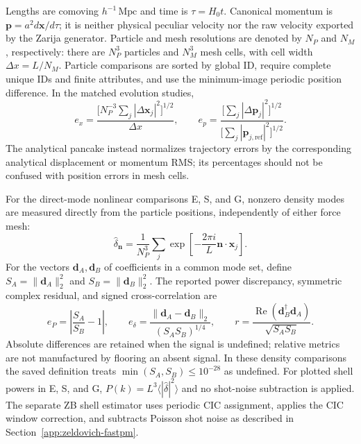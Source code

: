 Lengths are comoving $h^{-1}\,\mathrm{Mpc}$ and time is
$\tau=H_0t$.  Canonical momentum is $\boldsymbol p=a^2d\boldsymbol x/d\tau$;
it is neither physical peculiar velocity nor the raw velocity exported by the
Zarija generator.  Particle and mesh resolutions are denoted by $N_P$ and
$N_M$, respectively: there are $N_P^3$ particles and $N_M^3$ mesh cells, with
cell width $\Delta x=L/N_M$.  Particle comparisons are sorted by global ID,
require complete unique IDs and finite attributes, and use the minimum-image
periodic position difference.  In the matched evolution studies,
\begin{equation}
 e_x=\frac{\bigl[N_P^{-3}\sum_j|\Delta\boldsymbol x_j|^2\bigr]^{1/2}}
 {\Delta x},\qquad
 e_p=\frac{\bigl[\sum_j|\Delta\boldsymbol p_j|^2\bigr]^{1/2}}
 {\bigl[\sum_j|\boldsymbol p_{j,\mathrm{ref}}|^2\bigr]^{1/2}}.
 \label{eq:app-phase}
\end{equation}
The analytical pancake instead normalizes trajectory errors by the corresponding
analytical displacement or momentum RMS; its percentages should not be confused
with position errors in mesh cells.

For the direct-mode nonlinear comparisons E, S, and G, nonzero density modes
are measured directly from the particle positions, independently of either
force mesh:
\begin{equation}
 \widehat\delta_{\boldsymbol n}=
 \frac{1}{N_P^3}\sum_j\exp\!\left[-\frac{2\pi i}{L}
 \boldsymbol n\!\cdot\!\boldsymbol x_j\right].
 \label{eq:app-direct}
\end{equation}
For the vectors $\boldsymbol d_A,\boldsymbol d_B$ of coefficients in a common
mode set, define $S_A=\|\boldsymbol d_A\|_2^2$ and $S_B=\|\boldsymbol d_B\|_2^2$.
The reported power discrepancy, symmetric complex residual, and signed
cross-correlation are
\begin{equation}
 e_P=\left|\frac{S_A}{S_B}-1\right|,\qquad
 e_\delta=\frac{\|\boldsymbol d_A-\boldsymbol d_B\|_2}{(S_AS_B)^{1/4}},
 \qquad
 r=\frac{\operatorname{Re}(\boldsymbol d_B^\dagger\boldsymbol d_A)}
 {\sqrt{S_AS_B}}.
 \label{eq:app-density}
\end{equation}
Absolute differences are retained when the signal is undefined; relative
metrics are not manufactured by flooring an absent signal.  In these density
comparisons the saved definition treats $\min(S_A,S_B)\le10^{-28}$ as undefined.
For plotted shell powers in E, S, and G,
$P(k)=L^3\langle|\widehat\delta|^2\rangle$ and no shot-noise subtraction is
applied.  The separate ZB shell estimator uses periodic CIC assignment, applies
the CIC window correction, and subtracts Poisson shot noise as described in
Section~\ref{app:zeldovich-fastpm}.

